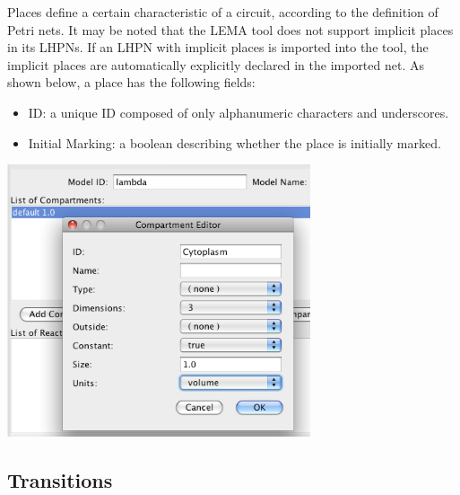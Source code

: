 \documentclass[titlepage,11pt]{article}
\begin{document}
\noindent
Places define a certain characteristic of a circuit, according to the
definition of Petri nets.  It may be noted that the LEMA tool does not support
implicit places in its LHPNs.  If an LHPN with implicit places is imported into
the tool, the implicit places are automatically explicitly declared in the
imported net. 
As shown below, a place has the following fields:
\begin{itemize}
\item ID: a unique ID composed of only alphanumeric characters and 
      underscores.
\item Initial Marking: a boolean describing whether the place is initially marked.
\end{itemize}
\begin{center}
\includegraphics[height=80mm]{screenshots/compartment}
\end{center}

\subsection{\label{transitions}Transitions}
\end{document}
